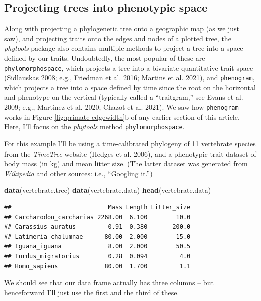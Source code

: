 \documentclass[fleqn,10pt,lineno]{wlpeerj} %
\newenvironment{Shaded}{\begin{snugshade}}{\end{snugshade}}
\newcommand{\FunctionTok}[1]{\textcolor[rgb]{0.13,0.29,0.53}{\textbf{#1}}}
\newcommand{\NormalTok}[1]{#1}
\begin{document}
\hypertarget{projecting-trees-into-phenotypic-space}{%
\subsection{Projecting trees into phenotypic space}\label{projecting-trees-into-phenotypic-space}}

Along with projecting a phylogenetic tree onto a geographic map (as we just saw), and projecting traits onto the edges and nodes of a plotted tree, the \emph{phytools} package also contains multiple methods to project a tree into a space defined by our traits. Undoubtedly, the most popular of these are \texttt{phylomorphospace}, which projects a tree into a bivariate quantitative trait space (Sidlauskas 2008; e.g., Friedman et al. 2016; Martins et al. 2021), and \texttt{phenogram}, which projects a tree into a space defined by time since the root on the horizontal and phenotype on the vertical (typically called a ``traitgram,'' see Evans et al. 2009; e.g., Martinez et al. 2020; Chazot et al. 2021). We saw how \texttt{phenogram} works in Figure \ref{fig:primate-edgewidth}b of any earlier section of this article. Here, I'll focus on the \emph{phytools} method \texttt{phylomorphospace}.

For this example I'll be using a time-calibrated phylogeny of 11 vertebrate species from the \emph{TimeTree} website (Hedges et al. 2006), and a phenotypic trait dataset of body mass (in kg) and mean litter size. (The latter dataset was generated from \emph{Wikipedia} and other sources: i.e., ``Googling it.'')

\begin{Shaded}
\begin{Highlighting}[]
\FunctionTok{data}\NormalTok{(vertebrate.tree)}
\FunctionTok{data}\NormalTok{(vertebrate.data)}
\FunctionTok{head}\NormalTok{(vertebrate.data)}
\end{Highlighting}
\end{Shaded}

\begin{verbatim}
##                           Mass Length Litter_size
## Carcharodon_carcharias 2268.00  6.100        10.0
## Carassius_auratus         0.91  0.380       200.0
## Latimeria_chalumnae      80.00  2.000        15.0
## Iguana_iguana             8.00  2.000        50.5
## Turdus_migratorius        0.28  0.094         4.0
## Homo_sapiens             80.00  1.700         1.1
\end{verbatim}

We should see that our data frame actually has three columns -- but henceforward I'll just use the first and the third of these.
\end{document}
